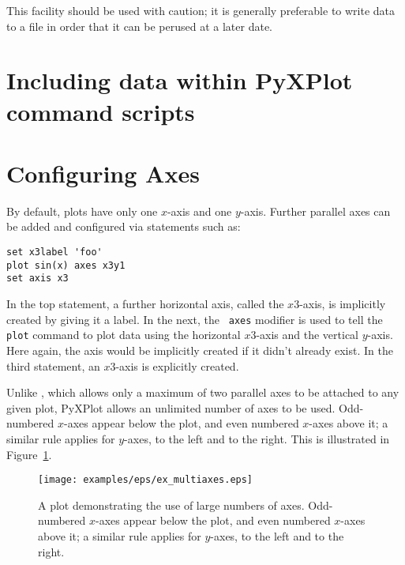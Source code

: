 This facility should be used with caution; it is generally preferable to write
data to a file in order that it can be perused at a later date.

\section{Including data within PyXPlot command scripts}

\section{Configuring Axes}
\label{axis_extensions}\label{ranges_multiaxes}\label{multiple_axes}

By default, plots have only one $x$-axis and one $y$-axis. Further parallel
axes can be added and configured via statements such as:

\begin{verbatim}
set x3label 'foo'
plot sin(x) axes x3y1
set axis x3
\end{verbatim}

\noindent In the top statement, a further horizontal axis, called the
$x3$-axis, is implicitly created by giving it a label. In the next, the {\tt
axes} modifier is used to tell the {\tt plot} command to plot data using the
horizontal $x3$-axis and the vertical $y$-axis. Here again, the axis would be
implicitly created if it didn't already exist.  In the third statement, an
$x3$-axis is explicitly created.

Unlike \gnuplot, which allows only a maximum of two parallel axes to be
attached to any given plot, PyXPlot allows an unlimited number of axes to be
used. Odd-numbered $x$-axes appear below the plot, and even numbered $x$-axes
above it; a similar rule applies for $y$-axes, to the left and to the right.
This is illustrated in Figure~\ref{fig:ex_multiaxes}.

\begin{figure}
\begin{center}
\texttt{[image: examples/eps/ex\_multiaxes.eps]}
\end{center}
\caption[A plot demonstrating the use of large numbers of axes]
{A plot demonstrating the use of large numbers of axes. Odd-numbered
$x$-axes appear below the plot, and even numbered $x$-axes above it; a similar
rule applies for $y$-axes, to the left and to the right.}
\label{fig:ex_multiaxes}
\end{figure}

